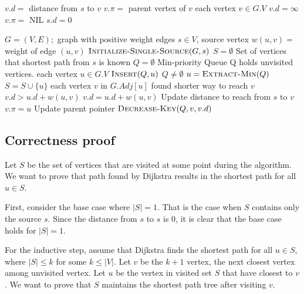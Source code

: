 \documentclass{article}
\begin{document}
\begin{codebox}
\li \Comment $v.d = $ distance from $s$ to $v$
\li \Comment $v.\pi = $ parent vertex of $v$
\li
\li \For each vertex $v \in G.V$
\li     \Do
            $v.d = \infty$
\li         $v.\pi =$ NIL
        \End
\li $s.d = 0$
\end{codebox}

\begin{codebox}
\li \Comment $G = (V,E);$ graph with positive weight edges
\li \Comment $s \in V$, source vertex
\li \Comment $w(u,v) = $ weight of edge $(u,v)$
\li
\li $\textsc{Initialize-Single-Source}(G,s)$
\li $S = \emptyset$ \hspace{0.5cm}\Comment Set of vertices that shortest path from $s$ is known  
\li $Q = \emptyset$ \hspace{0.5cm}\Comment Min-priority Queue
\li                 \hspace{1.5cm}\Comment Q holds unvisited vertices.
\li \For each vertex $u \in G.V$
\li     \Do
            $\textsc{Insert}(Q,u)$
        \End
\li \While $Q \neq \emptyset$
\li     \Do
            $u = \textsc{Extract-Min}(Q)$
\li         $S = S \cup \{u\}$
\li     \For each vertex $v$ in $G.Adj[u]$
\li         \Do
                \Comment found shorter way to reach $v$
\li             \If $v.d > u.d + w(u,v)$
\li                 \Do
                        $v.d = u.d + w(u,v)$    \hspace{0.5cm}\Comment Update distance to reach from $s$ to $v$
\li                     $v.\pi = u$             \hspace{2.2cm}\Comment Update parent pointer
\li                     $\textsc{Decrease-Key}(Q,v,v.d)$
                    \End
            \End
        \End
\end{codebox}

\subsection{Correctness proof}
Let $S$ be the set of vertices that are visited at some point during the algorithm. We want to prove that path found by Dijkstra results in the shortest path for all $u \in S$. 

First, consider the base case where $|S| = 1$. That is the case when $S$ contains only the source $s$. Since the distance from $s$ to $s$ is 0, it is clear that the base case holds for $|S| = 1$.

For the inductive step, assume that Dijkstra finds the shortest path for all $u \in S$, where $|S| \leq k$ for some $k \leq |V|$. Let $v$ be the $k + 1$ vertex, the next closest vertex among unvisited vertex. Let $u$ be the vertex in visited set $S$ that have closest to $v$. We want to prove that $S$ maintains the shortest path tree after visiting $v$.
\end{document}
